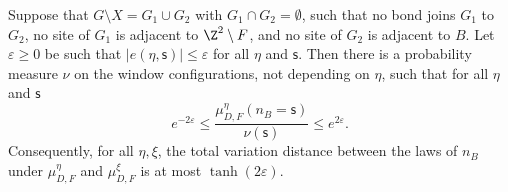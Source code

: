 \begin{lemma}\label{l:cut}
Suppose that $G \setminus X = G_1 \cup G_2$ with $G_1 \cap G_2 = \emptyset$, such that no bond joins $G_1$ to $G_2$, no site of $G_1$ is adjacent to $\Z^2 \setminus F$, and no site of $G_2$ is adjacent to $B$. Let $\varepsilon \ge 0$ be such that $|e(\eta, \mathsf s)| \le \varepsilon$ for all $\eta$ and $\mathsf s$. Then there is a probability measure $\nu$ on the window configurations, not depending on $\eta$, such that for all $\eta$ and $\mathsf s$
\begin{equation}\label{e:cutratio}
e^{-2 \varepsilon} \le \frac{\mu^\eta_{D, F}(n_B = \mathsf s)}{\nu(\mathsf s)} \le e^{2 \varepsilon} .
\end{equation}
Consequently, for all $\eta, \xi$, the total variation distance between the laws of $n_B$ under $\mu^\eta_{D, F}$ and $\mu^\xi_{D, F}$ is at most $\tanh(2 \varepsilon)$.
\end{lemma}

